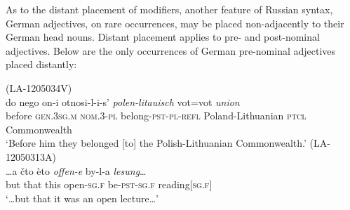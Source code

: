 As to the distant placement of modifiers, another feature of Russian syntax, German adjectives, on rare occurrences, may be placed non-adjacently to their German head nouns. Distant placement applies to pre- and post-nominal adjectives. Below are the only occurrences of German pre-nominal adjectives placed distantly: 

\ea
\label{ex:4:31}
(LA-1205034V)\\
\gll do nego on-i otnosi-l-i-s’ \textit{polen-litauisch}  vot=vot \textit{union}\\
	before \textsc{gen.3sg.m} \textsc{nom.3-pl}  belong-\textsc{pst-pl-refl} Poland-Lithuanian \textsc{ptcl} Commonwealth\\
\glt `Before him they belonged [to] the Polish-Lithuanian Commonwealth.'
\ex
\label{ex:4:32}
(LA-12050313A)\\
\gll \dots a čto èto \textit{offen-e}  by-l-a \textit{lesung}\dots \\
	but that this open-\textsc{sg.f} be-\textsc{pst-sg.f} reading[\textsc{sg.f}]\\
\glt `\dots{but} that it was an open lecture\dots'
\z


